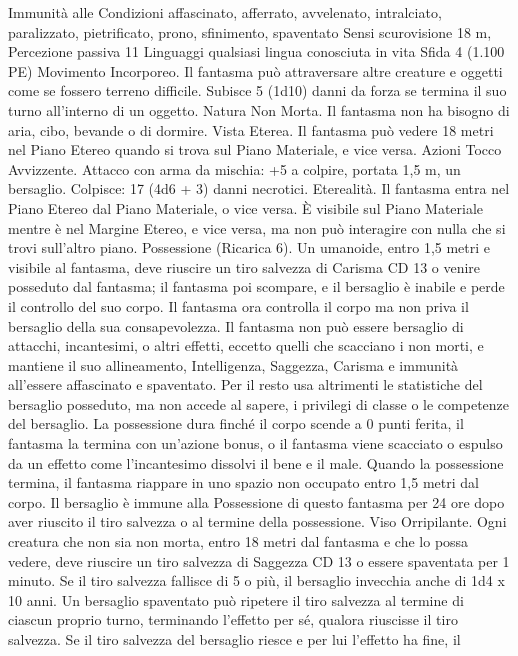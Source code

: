\begin{multicols}{2}
Immunità alle Condizioni affascinato, afferrato, avvelenato,
intralciato, paralizzato, pietrificato, prono, sfinimento, spaventato
Sensi scurovisione 18 m, Percezione passiva 11
Linguaggi qualsiasi lingua conosciuta in vita
Sfida 4 (1.100 PE)
Movimento Incorporeo. Il fantasma può attraversare altre creature e
oggetti come se fossero terreno difficile. Subisce 5 (1d10) danni da
forza se termina il suo turno all’interno di un oggetto.
Natura Non Morta. Il fantasma non ha bisogno di aria, cibo,
bevande o di dormire.
Vista Eterea. Il fantasma può vedere 18 metri nel Piano Etereo
quando si trova sul Piano Materiale, e vice versa.
Azioni
Tocco Avvizzente. Attacco con arma da mischia: +5 a colpire,
portata 1,5 m, un bersaglio.
Colpisce: 17 (4d6 + 3) danni necrotici.
Eterealità. Il fantasma entra nel Piano Etereo dal Piano Materiale, o vice
versa. È visibile sul Piano Materiale mentre è nel Margine Etereo, e vice
versa, ma non può interagire con nulla che si trovi sull’altro piano.
Possessione (Ricarica 6). Un umanoide, entro 1,5 metri e visibile al
fantasma, deve riuscire un tiro salvezza di Carisma CD 13 o venire
posseduto dal fantasma; il fantasma poi scompare, e il bersaglio è inabile
e perde il controllo del suo corpo. Il fantasma ora controlla il corpo ma
non priva il bersaglio della sua consapevolezza. Il fantasma non può
essere bersaglio di attacchi, incantesimi, o altri effetti, eccetto quelli che
scacciano i non morti, e mantiene il suo allineamento, Intelligenza,
Saggezza, Carisma e immunità all’essere affascinato e spaventato. Per il
resto usa altrimenti le statistiche del bersaglio posseduto, ma non accede
al sapere, i privilegi di classe o le competenze del bersaglio.
La possessione dura finché il corpo scende a 0 punti ferita, il fantasma la
termina con un’azione bonus, o il fantasma viene scacciato o espulso da un
effetto come l’incantesimo dissolvi il bene e il male. Quando la possessione
termina, il fantasma riappare in uno spazio non occupato entro 1,5 metri dal
corpo. Il bersaglio è immune alla Possessione di questo fantasma per 24 ore
dopo aver riuscito il tiro salvezza o al termine della possessione.
Viso Orripilante. Ogni creatura che non sia non morta, entro 18 metri
dal fantasma e che lo possa vedere, deve riuscire un tiro salvezza di
Saggezza CD 13 o essere spaventata per 1 minuto. Se il tiro salvezza
fallisce di 5 o più, il bersaglio invecchia anche di 1d4 x 10 anni. Un
bersaglio spaventato può ripetere il tiro salvezza al termine di ciascun
proprio turno, terminando l’effetto per sé, qualora riuscisse il tiro
salvezza. Se il tiro salvezza del bersaglio riesce e per lui l’effetto ha fine, il

\end{multicols}
